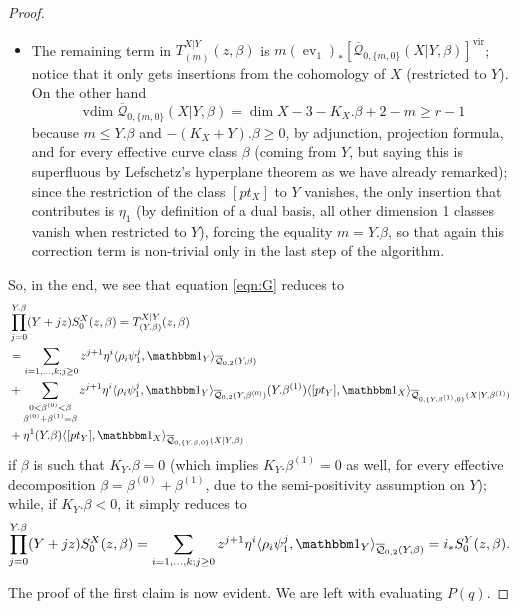 \documentclass[11pt]{amsart}
\newcommand{\Q}[4]{\overline{\mathcal Q}_{#1,#2}(#3,#4)}
\newcommand{\ev}{\operatorname{ev}}
\newcommand{\vdim}{\operatorname{vdim}}
\theoremstyle{plain}
\theoremstyle{definition}
\begin{document}
\begin{proof}
\begin{itemize}[leftmargin=*]
\item The remaining term in $T_{(m)}^{X|Y}(z,\beta)$ is $m(\ev_1)_*[\Q{0}{\{m,0\}}{X|Y}{\beta}]^\text{vir}$; notice that it only gets insertions from the cohomology of $X$ (restricted to $Y$). On the other hand
\[
 \vdim \Q{0}{\{m,0\}}{X|Y}{\beta}=\dim X-3 -K_X.\beta +2-m \geq r-1
\]
because $m\leq Y.\beta$ and $-(K_X+Y).\beta\geq 0$, by adjunction, projection formula, and for every effective curve class $\beta$ (coming from $Y$, but saying this is superfluous by Lefschetz's hyperplane theorem as we have already remarked); since the restriction of the class $[pt_X]$ to $Y$ vanishes, the only insertion that contributes is $\eta_1$ (by definition of a dual basis, all other dimension 1 classes vanish when restricted to $Y$), forcing the equality $m=Y.\beta$, so that again this correction term is non-trivial only in the last step of the algorithm.
\end{itemize}
So, in the end, we see that equation \ref{eqn:G} reduces to
\begin{align*}
 &\prod_{j=0}^{Y.\beta}(Y+jz) S_0^X(z,\beta) = T_{(Y.\beta)}^{X|Y}(z,\beta) \\
 &= \sum_{i=1,\ldots,k;j\geq 0}z^{j+1}\eta^i\langle \rho_i\psi_1^j,\mathbbm 1_{Y}\rangle_{\Q{0}{2}{Y}{\beta}} \\
 &+\sum_{\substack{0<\beta^{(0)}<\beta \\ \beta^{(0)}+\beta^{(1)}=\beta}}z^{j+1}\eta^i\langle \rho_i\psi_1^j,\mathbbm 1_{Y}\rangle_{\Q{0}{2}{Y}{\beta^{(0)}}}(Y.\beta^{(1)})\langle [pt_Y],\mathbbm 1_{X}\rangle_{\Q{0}{\{Y.\beta^{(1)},0\}}{X|Y}{\beta^{(1)}}}\\
 &+\eta^1(Y.\beta)\langle [pt_Y],\mathbbm 1_{X}\rangle_{\Q{0}{\{Y.\beta,0\}}{X|Y}{\beta}}
\end{align*}
if $\beta$ is such that $K_Y.\beta=0$ (which implies $K_Y.\beta^{(1)}=0$ as well, for every effective decomposition $\beta=\beta^{(0)}+\beta^{(1)}$, due to the semi-positivity assumption on $Y$); while, if $K_Y.\beta<0$, it simply reduces to
\[
 \prod_{j=0}^{Y.\beta}(Y+jz) S_0^X(z,\beta)= \sum_{i=1,\ldots,k;j\geq 0}z^{j+1}\eta^i\langle \rho_i\psi_1^j,\mathbbm 1_{Y}\rangle_{\Q{0}{2}{Y}{\beta}} = i_*S_0^Y(z,\beta).
\]


The proof of the first claim is now evident. We are left with evaluating $P(q)$.


\end{proof}
\end{document}
